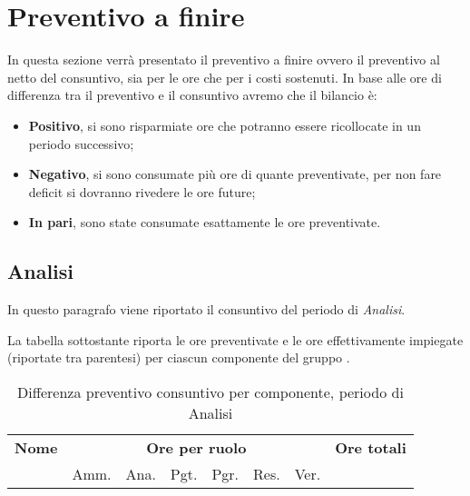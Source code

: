 

\section{Preventivo a finire}
\label{consuntivo}

In questa sezione verrà presentato il preventivo a finire ovvero il preventivo al netto del consuntivo, sia per le ore che per i costi sostenuti. In base alle ore di differenza tra il preventivo e il consuntivo avremo che il bilancio è:
\begin{itemize}
\item \textbf{Positivo}, si sono risparmiate ore che potranno essere ricollocate in un periodo successivo;
\item \textbf{Negativo}, si sono consumate più ore di quante preventivate, per non fare deficit si dovranno rivedere le ore future;
\item \textbf{In pari}, sono state consumate esattamente le ore preventivate.
\end{itemize}

\subsection{Analisi}

In questo paragrafo viene riportato il consuntivo del periodo di \textit{Analisi}.

La tabella sottostante riporta le ore preventivate e le ore effettivamente impiegate (riportate tra parentesi) per ciascun componente del gruppo \GroupName{}.
\begin{center}
\begin{table}[H]
\begin{tabular}{lccccccc}
\toprule
    \textbf{Nome}  & \multicolumn{6}{c}{\textbf{Ore per ruolo}} & \textbf{Ore totali} \\
     & Amm. & Ana. & Pgt. & Pgr. & Res. & Ver. & \\
    \midrule
    
    	
    
    \bottomrule
\end{tabular}
\caption{Differenza preventivo consuntivo per componente, periodo di Analisi}
\end{table}
\end{center}

